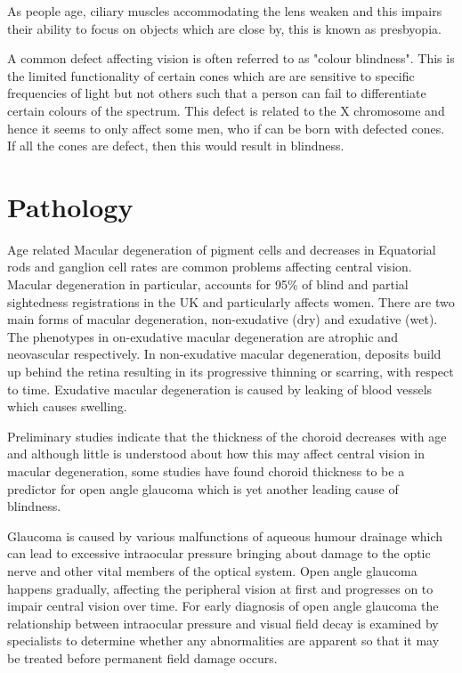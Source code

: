 As people age, ciliary muscles accommodating the lens weaken and
this impairs their ability to focus on objects which are close by, this is known as
presbyopia.\cite{fisher1985ciliary}


A common defect affecting vision is often referred to as "colour blindness".
This is the limited functionality of certain cones which are are sensitive
to specific frequencies of light but not others such that a person can fail
to differentiate certain colours of the spectrum. This defect is related to
the X chromosome and hence it seems to only affect some men, who if can be
born with defected cones.\cite{george1996clinical} If all the cones are defect,
then this would result in blindness.

\section{Pathology}

Age related Macular degeneration of pigment cells and decreases in
Equatorial rods and ganglion cell rates are common problems affecting
central vision.\cite{gao1992aging} Macular degeneration in particular,
accounts for 95\% of blind and partial sightedness registrations in the
UK and particularly affects women.\cite{o1998age,klein2005complement}
There are two main forms of macular degeneration, non-exudative (dry)
and exudative (wet). The phenotypes in on-exudative macular degeneration
are atrophic and neovascular respectively.\cite{kuno2011dry} In
non-exudative macular degeneration, deposits build up behind the retina
resulting in its progressive thinning or scarring, with respect to time.
Exudative macular degeneration is caused by leaking of blood vessels
which causes swelling.

Preliminary studies indicate that the thickness of the choroid decreases
with age and although little is understood about how this may affect
central vision in macular degeneration, some studies have found
choroid thickness to be a predictor for open angle glaucoma which
is yet another leading cause of blindness.
\cite{margolis2009pilot,gordon2002ocular}

Glaucoma is caused by various malfunctions of aqueous humour drainage
which can lead to excessive intraocular pressure bringing about damage
to the optic nerve and other vital members of the optical system.
\cite{distelhorst2003open} Open angle glaucoma happens gradually,
affecting the peripheral vision at first and progresses on to impair
central vision over time. For early diagnosis of open angle glaucoma
the relationship between intraocular pressure and visual field decay
is examined by specialists to determine whether any abnormalities are
apparent so that it may be treated before permanent field damage occurs.
\cite{goldmann1972open}

